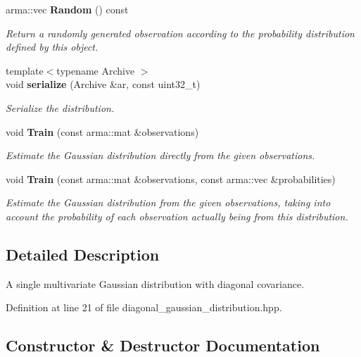 \begin{DoxyCompactItemize}
arma\+::vec \textbf{ Random} () const
\begin{DoxyCompactList}\small\item\em Return a randomly generated observation according to the probability distribution defined by this object. \end{DoxyCompactList}\item 
{\footnotesize template$<$typename Archive $>$ }\\void \textbf{ serialize} (Archive \&ar, const uint32\+\_\+t)
\begin{DoxyCompactList}\small\item\em Serialize the distribution. \end{DoxyCompactList}\item 
void \textbf{ Train} (const arma\+::mat \&observations)
\begin{DoxyCompactList}\small\item\em Estimate the Gaussian distribution directly from the given observations. \end{DoxyCompactList}\item 
void \textbf{ Train} (const arma\+::mat \&observations, const arma\+::vec \&probabilities)
\begin{DoxyCompactList}\small\item\em Estimate the Gaussian distribution from the given observations, taking into account the probability of each observation actually being from this distribution. \end{DoxyCompactList}\end{DoxyCompactItemize}


\subsection{Detailed Description}
A single multivariate Gaussian distribution with diagonal covariance. 

Definition at line 21 of file diagonal\+\_\+gaussian\+\_\+distribution.\+hpp.



\subsection{Constructor \& Destructor Documentation}
\mbox{\label{classmlpack_1_1distribution_1_1DiagonalGaussianDistribution_acdb3a37208d86c70813f6bd57976d91d}} 
